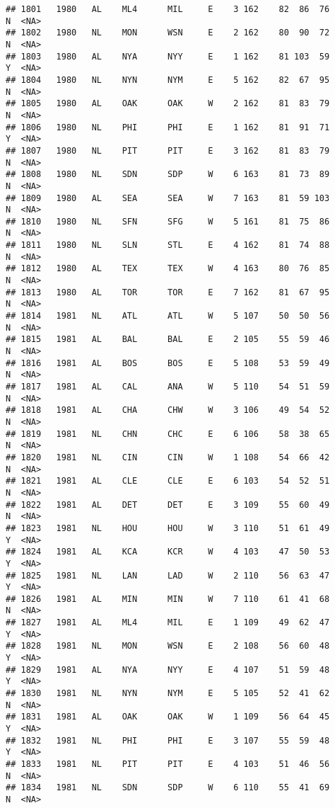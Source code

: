 \documentclass[]{article}
\begin{document}
\begin{verbatim}
## 1801   1980   AL    ML4      MIL     E    3 162    82  86  76      N  <NA>
## 1802   1980   NL    MON      WSN     E    2 162    80  90  72      N  <NA>
## 1803   1980   AL    NYA      NYY     E    1 162    81 103  59      Y  <NA>
## 1804   1980   NL    NYN      NYM     E    5 162    82  67  95      N  <NA>
## 1805   1980   AL    OAK      OAK     W    2 162    81  83  79      N  <NA>
## 1806   1980   NL    PHI      PHI     E    1 162    81  91  71      Y  <NA>
## 1807   1980   NL    PIT      PIT     E    3 162    81  83  79      N  <NA>
## 1808   1980   NL    SDN      SDP     W    6 163    81  73  89      N  <NA>
## 1809   1980   AL    SEA      SEA     W    7 163    81  59 103      N  <NA>
## 1810   1980   NL    SFN      SFG     W    5 161    81  75  86      N  <NA>
## 1811   1980   NL    SLN      STL     E    4 162    81  74  88      N  <NA>
## 1812   1980   AL    TEX      TEX     W    4 163    80  76  85      N  <NA>
## 1813   1980   AL    TOR      TOR     E    7 162    81  67  95      N  <NA>
## 1814   1981   NL    ATL      ATL     W    5 107    50  50  56      N  <NA>
## 1815   1981   AL    BAL      BAL     E    2 105    55  59  46      N  <NA>
## 1816   1981   AL    BOS      BOS     E    5 108    53  59  49      N  <NA>
## 1817   1981   AL    CAL      ANA     W    5 110    54  51  59      N  <NA>
## 1818   1981   AL    CHA      CHW     W    3 106    49  54  52      N  <NA>
## 1819   1981   NL    CHN      CHC     E    6 106    58  38  65      N  <NA>
## 1820   1981   NL    CIN      CIN     W    1 108    54  66  42      N  <NA>
## 1821   1981   AL    CLE      CLE     E    6 103    54  52  51      N  <NA>
## 1822   1981   AL    DET      DET     E    3 109    55  60  49      N  <NA>
## 1823   1981   NL    HOU      HOU     W    3 110    51  61  49      Y  <NA>
## 1824   1981   AL    KCA      KCR     W    4 103    47  50  53      Y  <NA>
## 1825   1981   NL    LAN      LAD     W    2 110    56  63  47      Y  <NA>
## 1826   1981   AL    MIN      MIN     W    7 110    61  41  68      N  <NA>
## 1827   1981   AL    ML4      MIL     E    1 109    49  62  47      Y  <NA>
## 1828   1981   NL    MON      WSN     E    2 108    56  60  48      Y  <NA>
## 1829   1981   AL    NYA      NYY     E    4 107    51  59  48      Y  <NA>
## 1830   1981   NL    NYN      NYM     E    5 105    52  41  62      N  <NA>
## 1831   1981   AL    OAK      OAK     W    1 109    56  64  45      Y  <NA>
## 1832   1981   NL    PHI      PHI     E    3 107    55  59  48      Y  <NA>
## 1833   1981   NL    PIT      PIT     E    4 103    51  46  56      N  <NA>
## 1834   1981   NL    SDN      SDP     W    6 110    55  41  69      N  <NA>

\end{verbatim}
\end{document}
